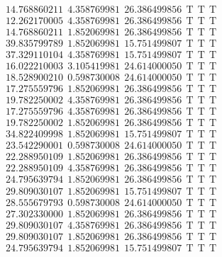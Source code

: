 \documentclass[10pt,a4paper]{article}
\begin{document}
\begin{itemize}
\begin{displaymath}
{\begin{aligned}
&14.768860211 ~~   4.358769981 ~~  26.386499856  ~~\mathrm{T  ~~ T  ~~ T } \\ 
&12.262170005 ~~   4.358769981 ~~  26.386499856  ~~\mathrm{T  ~~ T  ~~ T } \\ 
&14.768860211 ~~   1.852069981 ~~  26.386499856  ~~\mathrm{T  ~~ T  ~~ T } \\ 
&39.835799789 ~~   1.852069981 ~~  15.751499807  ~~\mathrm{T  ~~ T  ~~ T } \\ 
&37.329110104 ~~   4.358769981 ~~  15.751499807  ~~\mathrm{T  ~~ T  ~~ T } \\ 
&16.022210003 ~~   3.105419981 ~~  24.614000050  ~~\mathrm{T  ~~ T  ~~ T } \\ 
&18.528900210 ~~   0.598730008 ~~  24.614000050  ~~\mathrm{T  ~~ T  ~~ T } \\ 
&17.275559796 ~~   1.852069981 ~~  26.386499856  ~~\mathrm{T  ~~ T  ~~ T } \\ 
&19.782250002 ~~   4.358769981 ~~  26.386499856  ~~\mathrm{T  ~~ T  ~~ T } \\ 
&17.275559796 ~~   4.358769981 ~~  26.386499856  ~~\mathrm{T  ~~ T  ~~ T } \\ 
&19.782250002 ~~   1.852069981 ~~  26.386499856  ~~\mathrm{T  ~~ T  ~~ T } \\ 
&34.822409998 ~~   1.852069981 ~~  15.751499807  ~~\mathrm{T  ~~ T  ~~ T } \\ 
&23.542290001 ~~   0.598730008 ~~  24.614000050  ~~\mathrm{T  ~~ T  ~~ T } \\ 
&22.288950109 ~~   1.852069981 ~~  26.386499856  ~~\mathrm{T  ~~ T  ~~ T } \\ 
&22.288950109 ~~   4.358769981 ~~  26.386499856  ~~\mathrm{T  ~~ T  ~~ T } \\ 
&24.795639794 ~~   1.852069981 ~~  26.386499856  ~~\mathrm{T  ~~ T  ~~ T } \\ 
&29.809030107 ~~   1.852069981 ~~  15.751499807  ~~\mathrm{T  ~~ T  ~~ T } \\ 
&28.555679793 ~~   0.598730008 ~~  24.614000050  ~~\mathrm{T  ~~ T  ~~ T } \\ 
&27.302330000 ~~   1.852069981 ~~  26.386499856  ~~\mathrm{T  ~~ T  ~~ T } \\ 
&29.809030107 ~~   4.358769981 ~~  26.386499856  ~~\mathrm{T  ~~ T  ~~ T } \\ 
&29.809030107 ~~   1.852069981 ~~  26.386499856  ~~\mathrm{T  ~~ T  ~~ T } \\ 
&24.795639794 ~~   1.852069981 ~~  15.751499807  ~~\mathrm{T  ~~ T  ~~ T } \\ 

\end{aligned}}
\end{displaymath}
\end{itemize}
\end{document}
